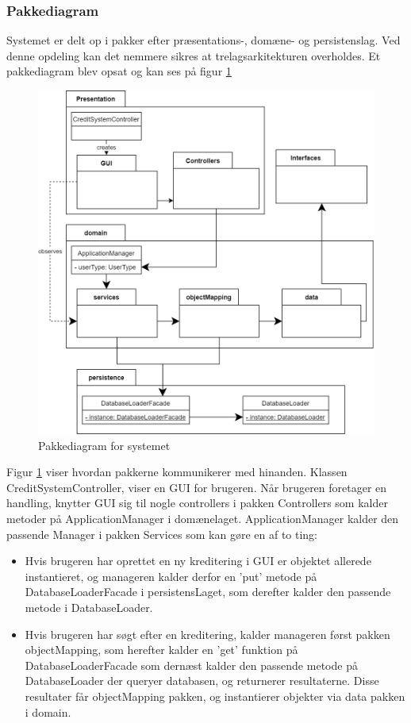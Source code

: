 \subsubsection{Pakkediagram} Systemet er delt op i pakker efter præsentations-,
domæne- og persistenslag. Ved denne opdeling kan det nemmere sikres at
trelagsarkitekturen overholdes. Et pakkediagram blev opsat og kan ses på figur
\ref{fig:PackageDiagram}

\begin{figure}[H]
    \centering
\includegraphics[scale = 0.3]{images/PackageDiagram.png}
    \caption{Pakkediagram for systemet}
    \label{fig:PackageDiagram}
\end{figure}

Figur \ref{fig:PackageDiagram} viser hvordan pakkerne kommunikerer med hinanden.
Klassen CreditSystemController, viser en GUI for brugeren. Når brugeren
foretager en handling, knytter GUI sig til nogle controllers i pakken
Controllers som kalder metoder på ApplicationManager i domænelaget.
ApplicationManager kalder den passende Manager i pakken Services som kan gøre en
af to ting: 

\begin{itemize}
    \item Hvis brugeren har oprettet en ny kreditering i GUI er objektet
        allerede instantieret, og manageren kalder derfor en 'put' metode på
        DatabaseLoaderFacade i persistensLaget, som derefter kalder den passende
        metode i DatabaseLoader. 
    \item Hvis brugeren har søgt efter en kreditering, kalder manageren først
        pakken objectMapping, som herefter kalder en 'get' funktion på
        DatabaseLoaderFacade som dernæst kalder den passende metode på
        DatabaseLoader der queryer databasen, og returnerer resultaterne. Disse
        resultater får objectMapping pakken, og instantierer objekter via data
        pakken i domain.
\end{itemize}



